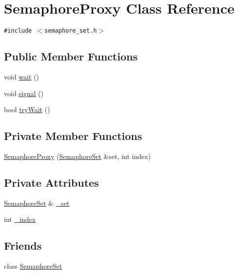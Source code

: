 \hypertarget{classSemaphoreProxy}{
\section{SemaphoreProxy Class Reference}
\label{classSemaphoreProxy}
}
{\tt \#include $<$semaphore\_\-set.h$>$}

\subsection*{Public Member Functions}
\begin{CompactItemize}
\item 
void \hyperlink{classSemaphoreProxy_7a98f97acc2ebd867f4f0026be765f1a}{wait} ()
\item 
void \hyperlink{classSemaphoreProxy_480137f286fec8251c8af8cb97948e19}{signal} ()
\item 
bool \hyperlink{classSemaphoreProxy_5c0aac2bf4ac6b80dfa38145f75b9d37}{tryWait} ()
\end{CompactItemize}
\subsection*{Private Member Functions}
\begin{CompactItemize}
\item 
\hyperlink{classSemaphoreProxy_3e2bbed3c0aebe14a1f5f529297df0f6}{SemaphoreProxy} (\hyperlink{classSemaphoreSet}{SemaphoreSet} \&set, int index)
\end{CompactItemize}
\subsection*{Private Attributes}
\begin{CompactItemize}
\item 
\hyperlink{classSemaphoreSet}{SemaphoreSet} \& \hyperlink{classSemaphoreProxy_5beeb50683a0de74f3f76c4891181f69}{\_\-set}
\item 
int \hyperlink{classSemaphoreProxy_bc60613f713d387d753d036c92a392c6}{\_\-index}
\end{CompactItemize}
\subsection*{Friends}
\begin{CompactItemize}
\item 
class \hyperlink{classSemaphoreProxy_cda15c201fe6c8eb854baebf4fa62df6}{SemaphoreSet}
\end{CompactItemize}


